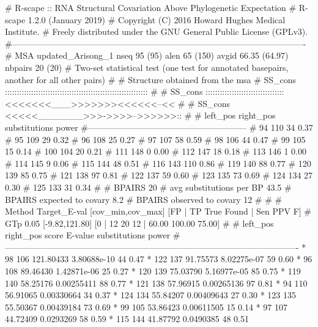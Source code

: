 \begin{sreoutput}
# R-scape :: RNA Structural Covariation Above Phylogenetic Expectation
# R-scape 1.2.0 (January 2019)
# Copyright (C) 2016 Howard Hughes Medical Institute.
# Freely distributed under the GNU General Public License (GPLv3).
#-------------------------------------------------------------------------------------------------------
# MSA updated_Arisong_1 nseq 95 (95) alen 65 (150) avgid 66.35 (64.97) nbpairs 20 (20)
# Two-set statistical test (one test for annotated basepairs, another for all other pairs)
#
# Structure obtained from the msa
# SS_cons ::::::::::::::::::::::::::::::::::::::::::::::::::::::::::::
#
# SS_cons :::::::::::::::::::::::::::::::::<<<<<<<___>>>>>>><<<<<<--<<
#
# SS_cons <<<<<_______>>>->>>>-->>>>>>::
#
# left_pos      right_pos    substitutions      power
#--------------------------------------------------------
# 94		110		34		0.37
# 95		109		29		0.32
# 96		108		25		0.27
# 97		107		58		0.59
# 98		106		44		0.47
# 99		105		15		0.14
# 100		104		20		0.21
# 111		148		0		0.00
# 112		147		18		0.18
# 113		146		1		0.00
# 114		145		9		0.06
# 115		144		48		0.51
# 116		143		110		0.86
# 119		140		88		0.77
# 120		139		85		0.75
# 121		138		97		0.81
# 122		137		59		0.60
# 123		135		73		0.69
# 124		134		27		0.30
# 125		133		31		0.34
#
# BPAIRS 20
# avg substitutions per BP  43.5
# BPAIRS expected to covary 8.2
# BPAIRS observed to covary 12
#
#
# Method Target_E-val [cov_min,cov_max] [FP | TP True Found | Sen PPV F] 
# GTp    0.05         [-9.82,121.80]     [0 | 12 20 12 | 60.00 100.00 75.00] 
#
#       left_pos       right_pos        score          E-value       substitutions      power
#-------------------------------------------------------------------------------------------------------
*	      98	     106	121.80433	3.80688e-10	44		0.47
*	     122	     137	91.75573	8.02275e-07	59		0.60
*	      96	     108	89.46430	1.42871e-06	25		0.27
*	     120	     139	75.03790	5.16977e-05	85		0.75
*	     119	     140	58.25176	0.00255411	88		0.77
*	     121	     138	57.96915	0.00265136	97		0.81
*	      94	     110	56.91065	0.00330664	34		0.37
*	     124	     134	55.84207	0.00409643	27		0.30
*	     123	     135	55.50367	0.00439184	73		0.69
*	      99	     105	53.86423	0.00611505	15		0.14
*	      97	     107	44.72409	0.0293269	58		0.59
*	     115	     144	41.87792	0.0490385	48		0.51


\end{sreoutput}
